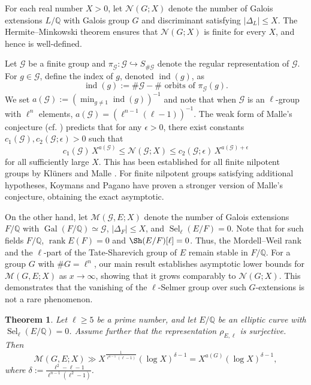 \documentclass[11pt,reqno]{amsart}
\newtheorem{theorem}{Theorem}[section]
\newcommand{\cG}{\mathcal{G}}
\newcommand{\Q}{\mathbb{Q}}
\newcommand{\op}[1]{\operatorname{#1}}
\numberwithin{equation}{section}
\begin{document}
For each real number \( X > 0 \), let \( \mathcal{N}(G; X) \) denote the number of Galois extensions \( L/\Q \) with Galois group \( G \) and discriminant satisfying \( |\Delta_L| \leq X \). The Hermite–Minkowski theorem ensures that \( \mathcal{N}(G; X) \) is finite for every \( X \), and hence is well-defined.

Let $\cG$ be a finite group and \( \pi_\cG : \cG \hookrightarrow S_{\#\cG} \) denote the regular representation of \( \cG \). For \( g \in \cG \), define the index of \( g \), denoted \( \operatorname{ind}(g) \), as
\[
\operatorname{ind}(g) := \#\cG - \#\text{ orbits of } \pi_\cG(g).
\]
We set $a(\cG) := \left( \min_{g \neq 1} \operatorname{ind}(g) \right)^{-1}$ and note that when $\cG$ is an $\ell$-group with $\ell^n$ elements, $a(\cG)= \left( \ell^{n-1}(\ell - 1) \right)^{-1}$. The weak form of Malle’s conjecture (cf. \cite[p.316]{Malle1}) predicts that for any \( \epsilon > 0 \), there exist constants \( c_1(\cG), c_2(\cG; \epsilon) > 0 \) such that
\[
c_1(\cG)\, X^{a(\cG)} \leq \mathcal{N}(\cG; X) \leq c_2(\cG; \epsilon)\, X^{a(\cG) + \epsilon}
\]
for all sufficiently large \( X \). This has been established for all finite nilpotent groups by Kl\"uners and Malle \cite{klunersmalle}. For finite nilpotent groups satisfying additional hypotheses, Koymans and Pagano \cite{koymans2023malle} have proven a stronger version of Malle's conjecture, obtaining the exact asymptotic.

On the other hand, let \( \mathcal{M}(\cG, E; X) \) denote the number of Galois extensions \( F/\Q \) with \( \operatorname{Gal}(F/\Q) \simeq \cG \), \( |\Delta_F| \leq X \), and \( \operatorname{Sel}_\ell(E/F) = 0 \). Note that for such fields $F/\Q$, $\op{rank}E(F)=0$ and $\Sh(E/F)[\ell]=0$. Thus, the Mordell--Weil rank and the $\ell$-part of the Tate-Sharevich group of $E$ remain stable in $F/\Q$. For a group $G$ with $\# G=\ell^n$, our main result establishes asymptotic lower bounds for \( \mathcal{M}(G, E; X) \) as \( x \to \infty \), showing that it grows comparably to \( \mathcal{N}(G; X) \). This demonstrates that the vanishing of the \( \ell \)-Selmer group over such \( G \)-extensions is not a rare phenomenon.

\begin{theorem}\label{main thm of section 4}
Let \( \ell \geq 5 \) be a prime number, and let \( E/\Q \) be an elliptic curve with \( \operatorname{Sel}_\ell(E/\Q) = 0 \). Assume further that the representation \( \rho_{E,\ell} \) is surjective. Then
\[
\mathcal{M}(G, E; X) \gg X^{\frac{1}{\ell^{n-1}(\ell - 1)}} (\log X)^{\delta - 1} = X^{a(G)} (\log X)^{\delta - 1},
\]
where \( \delta := \frac{\ell^2 - \ell - 1}{\ell^{n-1}(\ell^2 - 1)} \).
\end{theorem}
\end{document}
